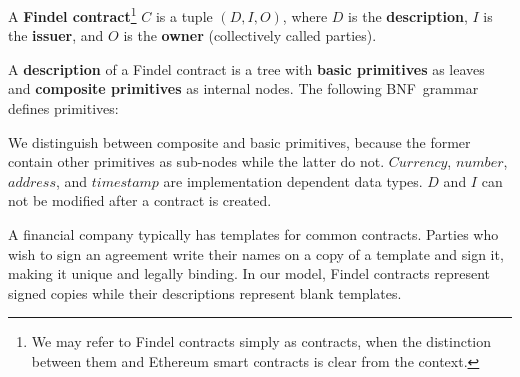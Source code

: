 \begin{definition} \label{def:Ch10_Findel_FindelContract}
	A \textbf{Findel contract}\footnote{We may refer to Findel contracts simply as contracts, when the distinction between them and Ethereum smart contracts is clear from the context.} $C$ is a tuple $(D,I,O)$, where $D$ is the \textbf{description}, $I$ is the \textbf{issuer}, and $O$ is the \textbf{owner} (collectively called parties). 
\end{definition}

\begin{definition} \label{def:Ch10_Findel_Description}
	A \textbf{description} of a Findel contract is a tree with \textbf{basic primitives} as leaves and \textbf{composite primitives} as internal nodes. The following BNF~grammar defines primitives:
	\iffalse
	\begin{grammar}
		
		<basic> ::= "Zero" | "One" "(" <currency> ")"
		
		<scale> ::= "Scale" "(" <number> "," <primitive> ")"
		
		<scaleObs> ::= "ScaleObs" "(" <address> "," <primitive> ")"
		
		<give> ::= "Give" "(" <primitive> ")"
		
		<and> ::= "And" "(" <primitive> "," <primitive> ")"
		
		<or> ::= "Or" "(" <primitive> "," <primitive> ")"
		
		<if> ::= "If" "(" <address> "," <primitive> "," <primitive> ")"
		
		<timebound> ::= "Timebound" "(" <timestamp> ", " <timestamp> "," <primitive> ")"
		
		<composite> ::= <scale> | <scaleObs> | <give> | <and> | <or> | <if> | <timebound>
		
		<primitive> ::= <basic> | <composite>
		
	\end{grammar}
	\fi
\end{definition}

We distinguish between composite and basic primitives, because the former contain other primitives as sub-nodes while the latter do not.
\(Currency\), \(number\), \(address\), and \(timestamp\) are implementation dependent data types.
$D$ and $I$ can not be modified after a contract is created.

A financial company typically has templates for common contracts.
Parties who wish to sign an agreement write their names on a copy of a template and sign it, making it unique and legally binding.
In our model, Findel contracts represent signed copies while their descriptions represent blank templates.

